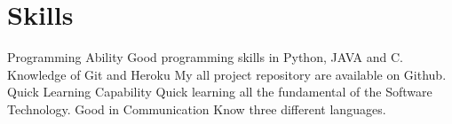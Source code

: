 \documentclass[]{cv-style}
\begin{document}

\section{Skills}
  \vspace{-0.2cm}

\begin{entrylist}

\entry{}
  {Programming Ability}
{}
{\jobtitle{}Good programming skills in Python, JAVA and C.}
\entry{}
{Knowledge of Git and Heroku}{}
{\jobtitle{}My all project repository are available on Github. }
\entry{}
  {Quick Learning Capability }
  {}
  {\jobtitle{}Quick learning all the fundamental of the Software Technology.}
  \entry
  {}
  {Good in Communication}
  {}
  {\jobtitle{}Know three different languages. }


  

\end{entrylist}
\end{document}
